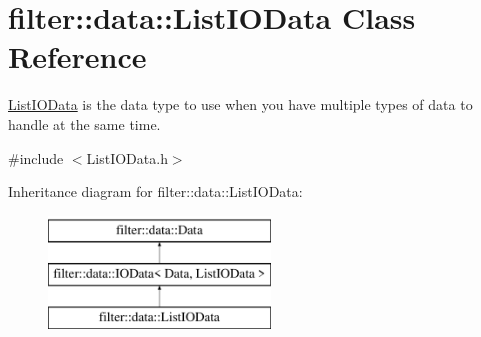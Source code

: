 \hypertarget{classfilter_1_1data_1_1_list_i_o_data}{}\section{filter\+:\+:data\+:\+:List\+I\+O\+Data Class Reference}
\label{classfilter_1_1data_1_1_list_i_o_data}


\hyperlink{classfilter_1_1data_1_1_list_i_o_data}{List\+I\+O\+Data} is the data type to use when you have multiple types of data to handle at the same time.  




{\ttfamily \#include $<$List\+I\+O\+Data.\+h$>$}

Inheritance diagram for filter\+:\+:data\+:\+:List\+I\+O\+Data\+:\begin{figure}[H]
\begin{center}
\leavevmode
\includegraphics[height=3.000000cm]{db/d90/classfilter_1_1data_1_1_list_i_o_data}
\end{center}
\end{figure}
